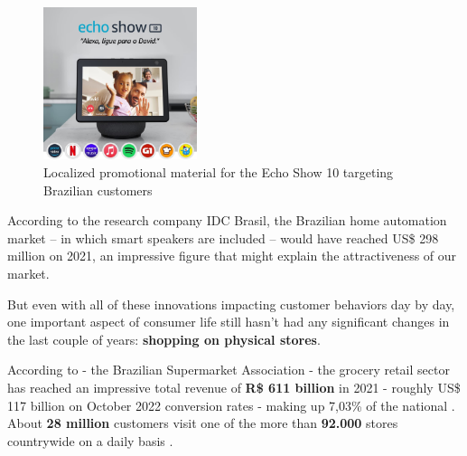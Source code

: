 \documentclass[openright]{normas-utf-tex} %
\begin{document}
\begin{figure}[h!]
	\centering
	\includegraphics[width=0.4\textwidth]{./images/alexabr.jpg} %
	\caption[Localized promotional material for the Echo Show 10 targeting Brazilian customers]{Localized promotional material for the Echo Show 10 targeting Brazilian customers}
    \label{fig:alexabr}
\end{figure}

According to the research company IDC Brasil, the Brazilian home automation
market -- in which smart speakers are included -- would have reached US\$ 298
million on 2021, an impressive figure that might explain the attractiveness of
our market.

%


But even with all of these innovations impacting customer behaviors day by day, one
important aspect of consumer life still hasn't had any significant changes in
the last couple of years: \textbf{shopping on
physical stores}.

According to  - the
Brazilian Supermarket Association - the grocery retail sector has reached an
impressive total revenue of \textbf{R\$ 611 billion} in 2021 - roughly US\$ 117 billion on
October 2022 conversion rates - making up 7,03\% of the national . About \textbf{28 million} customers visit one of the more than
\textbf{92.000} stores countrywide on a daily basis \cite{Abras2022}.
\end{document}
